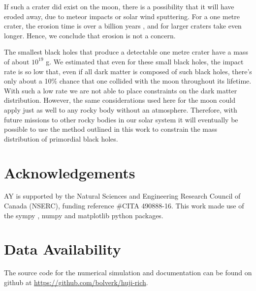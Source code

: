 \documentclass[usenatbib]{mnras}
\begin{document}
If such a crater did exist on the moon, there is a possibility that it will have eroded away, due to meteor impacts or solar wind sputtering. For a one metre crater, the erosion time is over a billion years \citep{McDonnell1977TheSurface}, and for larger craters take even longer. Hence, we conclude that erosion is not a concern.

The smallest black holes that produce a detectable one metre crater have a mass of about $10^{19}$ g. We estimated that even for these small black holes, the impact rate is so low that, even if all dark matter is composed of such black holes, there's only about a 10\% chance that one collided with the moon throughout its lifetime. With such a low rate we are not able to place constraints on the dark matter distribution. However, the same considerations used here for the moon could apply just as well to any rocky body without an atmosphere. Therefore, with future missions to other rocky bodies in our solar system it will eventually be possible to use the method outlined in this work to constrain the mass distribution of primordial black holes.

\section*{Acknowledgements}

AY is supported by the Natural
Sciences and Engineering Research Council of Canada (NSERC), funding
reference \#CITA 490888-16. This work made use of the sympy \citep{Meurer2017SymPy:Python}, numpy \citep{Oliphant2006ANumPy} and matplotlib \citep{Hunter2007Matplotlib:Environment} python packages.

\section*{Data Availability}

The source code for the numerical simulation and documentation can be found on github at \url{https://github.com/bolverk/huji-rich}.






\end{document}
